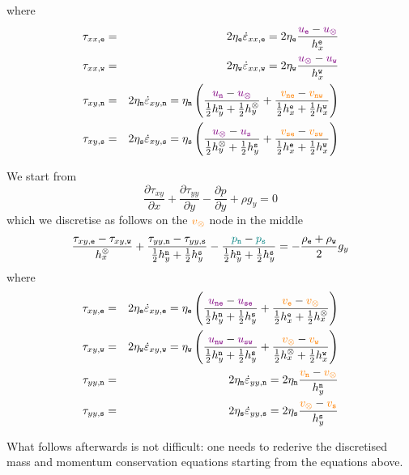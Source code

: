 where
\begin{eqnarray}
\tau_{xx,{\tt e}} 
&=& 2 \eta_{\tt e} \dot{\varepsilon}_{xx,{\tt e}} 
= 2\eta_{\tt e} \frac{{\color{violet} u_{\tt e}}-{\color{violet} u_\otimes}}{h_x^{\tt e}} 
\nonumber \\
\tau_{xx,{\tt w}} 
&=& 2 \eta_{\tt w} \dot{\varepsilon}_{xx,{\tt w}} 
= 2\eta_{\tt w} \frac{{\color{violet} u_\otimes}-{\color{violet} u_{\tt w}}}{h_x^{\tt w}} 
\nonumber\\
\tau_{xy,{\tt n}} &=& 2 \eta_{\tt n} \dot{\varepsilon}_{xy,{\tt n}} 
= \eta_{\tt n} \left( \frac{{\color{violet} u_{\tt n}}-{\color{violet} u_\otimes}}{\frac12 h_y^{\tt n} + \frac12 h_y^\otimes} 
+\frac{{\color{orange} v_{\tt ne}}-{\color{orange} v_{\tt nw}}}{\frac12 h_x^{\tt e} + \frac12 h_x^{\tt w}} \right) 
\nonumber\\
\tau_{xy,{\tt s}} &=& 2 \eta_{\tt s} \dot{\varepsilon}_{xy,{\tt s}} 
= \eta_{\tt s} \left( \frac{{\color{violet} u_\otimes}-{\color{violet} u_{\tt s}}}{\frac12 h_y^\otimes + \frac12 h_y^{\tt s}} 
+\frac{{\color{orange}v_{\tt se}}-{\color{orange} v_{\tt sw}}}{\frac12 h_x^{\tt e} + \frac12 h_x^{\tt w}} \right)  \nonumber
\end{eqnarray}










We start from
\[
\frac{\partial \tau_{xy}}{\partial x}  + 
\frac{\partial \tau_{yy}}{\partial y}  
- \frac{\partial p}{\partial y} + \rho g_y = 0
\]
which we discretise as follows on the ${\color{orange} v_\otimes}$ node in the middle
\[
\frac{\tau_{xy,{\tt e}}-\tau_{xy,{\tt w}}}{h_x^\otimes} 
+ \frac{\tau_{yy,{\tt n}}-\tau_{yy,{\tt s}}}{\frac12 h_y^{\tt n} + \frac12 h_y^{\tt s}} 
-\frac{{\color{teal}p_{\tt n}}-{\color{teal}p_{\tt s}}}{\frac12 h_y^{\tt n} + \frac12 h_y^{\tt s}} 
= -\frac{\rho_{\tt e}+\rho_{\tt w}}{2} g_y
\]
where
\begin{eqnarray}
\tau_{xy,{\tt e}} 
&=& 2 \eta_{\tt e} \dot{\varepsilon}_{xy,{\tt e}} 
= \eta_{\tt e} \left( \frac{{\color{violet} u_{\tt ne}}-{\color{violet} u_{\tt se}}}{\frac12 h_y^{\tt n} + \frac12 h_y^{\tt s}} 
+\frac{{\color{orange} v_{\tt e}}-{\color{orange} v_\otimes}}{\frac12 h_x^{\tt e} + \frac12 h_x^{\otimes}} \right) 
\nonumber \\
\tau_{xy,{\tt w}} 
&=& 2 \eta_{\tt w} \dot{\varepsilon}_{xy,{\tt w}} 
= \eta_{\tt w} \left( \frac{{\color{violet} u_{\tt nw}}-{\color{violet} u_{\tt sw}}}{\frac12 h_y^{\tt n} + \frac12 h_y^{\tt s}} 
+\frac{{\color{orange} v_\otimes} - {\color{orange} v_{\tt w}}}{\frac12 h_x^{\otimes} + \frac12 h_x^{\tt w}} \right) 
\nonumber\\
\tau_{yy,{\tt n}} 
&=& 2 \eta_{\tt n} \dot{\varepsilon}_{yy,{\tt n}} 
= 2\eta_{\tt n} \frac{{\color{orange} v_{\tt n}}-{\color{orange} v_\otimes}}{h_y^{\tt n}} 
\nonumber\\
\tau_{yy,{\tt s}} 
&=& 2 \eta_{\tt s} \dot{\varepsilon}_{yy,{\tt s}} 
= 2\eta_{\tt s} \frac{{\color{orange} v_\otimes} -{\color{orange} v_{\tt s}}}{h_y^{\tt s}} 
 \nonumber
\end{eqnarray}

What follows afterwards is not difficult: one needs to rederive the discretised mass and momentum 
conservation equations starting from the equations above. 


